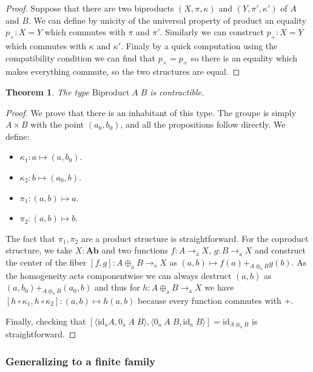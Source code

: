 \documentclass{article}
\newtheorem{them}[defi]{Theorem}
\newcommand{\toa}[0]{\to_\mathrm a}
\newcommand{\idd}[0]{\mathrm{id}}
\newcommand{\oplusa}[0]{\oplus_\mathrm a}
\begin{document}
\begin{proof}
    Suppose that there are two biproducts $(X,\pi,\kappa)$ and $(Y,\pi',\kappa')$ of $A$ and $B$. 
    We can define by unicity of the universal property of product an equality $p_\times : X = Y$ which
    commutes with $\pi$ and $\pi'$. Similarly we can construct $p_+ : X = Y$ which commutes with $\kappa$ and
    $\kappa'$. Finaly by a quick computation using the compatibility condition we can find that $p_\times =
    p_+$ so there is an equality which makes everything commute, so the two structures are equal.
\end{proof}

\begin{them}
    The type $\mathrm{Biproduct}\;A\;B$ is contractible.
\end{them}

\begin{proof}
    We prove that there is an inhabitant of this type. The groupe is simply $A\times B$ with the point $(a_0,
    b_0)$, and all the propositions follow directly. We define:
    \begin{itemize}
        \item $\kappa_1 : a \mapsto (a,b_0)$.
        \item $\kappa_2 : b \mapsto (a_0,b)$.
        \item $\pi_1 : (a,b) \mapsto a$.
        \item $\pi_2 : (a,b) \mapsto b$.
    \end{itemize}

    The fact that $\pi_1,\pi_2$ are a product structure is straightforward. For the coproduct structure, we
    take $X : \textbf{Ab}$ and two functions $f : A\toa X$, $g : B \toa X$ and construct the center of the
    fiber $[f,g] : A \oplusa B \toa X$ as $(a,b) \mapsto f(a)+_{A\oplusa B} g(b)$. As the homogeneity acts
    componentwise we can always destruct $(a,b)$ as $(a,b_0)+_{A\oplusa B} (a_0,b)$ and thus for
    $h : A \oplusa B \toa X$ we have $[h\circ \kappa_1,h\circ \kappa_2] : (a,b) \mapsto h(a,b)$ because
    every function commutes with $+$.

    Finally, checking that $[\langle \idd_\mathrm a A,0_\mathrm a\;A\;B\rangle , \langle 0_\mathrm a\;A\;B,
    \idd_\mathrm a\;B\rangle] = \idd_{A\oplusa B}$ is straightforward.
\end{proof}

\subsubsection{Generalizing to a finite family}
\end{document}
